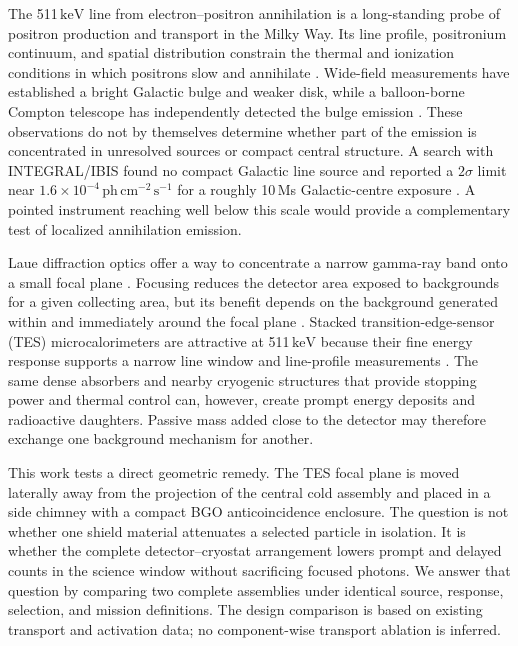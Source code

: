 \documentclass[11pt]{article}
\newcommand{\keV}{\ensuremath{\,\mathrm{keV}}\xspace}
\newcommand{\phflux}{\ensuremath{\,\mathrm{ph\,cm^{-2}\,s^{-1}}}\xspace}
\begin{document}
The 511\keV line from electron--positron annihilation is a long-standing probe
of positron production and transport in the Milky Way. Its line profile,
positronium continuum, and spatial distribution constrain the thermal and
ionization conditions in which positrons slow and annihilate
\citep{Jean2006,Prantzos2011,Siegert2016}. Wide-field measurements have
established a bright Galactic bulge and weaker disk, while a balloon-borne
Compton telescope has independently detected the bulge emission
\citep{Kierans2020}. These observations do not by themselves determine whether
part of the emission is concentrated in unresolved sources or compact central
structure. A search with INTEGRAL/IBIS found no compact Galactic line source and
reported a $2\sigma$ limit near $1.6\times10^{-4}\phflux$ for a roughly 10\,Ms
Galactic-centre exposure \citep{DeCesare2011}. A pointed instrument reaching
well below this scale would provide a complementary test of localized
annihilation emission.

Laue diffraction optics offer a way to concentrate a narrow gamma-ray band
onto a small focal plane \citep{Barriere2009}. Focusing reduces the
detector area exposed to backgrounds for a given collecting area, but its
benefit depends on the background generated within and immediately around the
focal plane \citep{Weidenspointner2006}. Stacked transition-edge-sensor (TES)
microcalorimeters are attractive at 511\keV because their fine energy response
supports a narrow line window and line-profile measurements
\citep{Gottardi2021,Shirazi2023,Hu2026}. The same dense absorbers and nearby
cryogenic structures that provide stopping power and thermal control can,
however, create prompt energy deposits and radioactive daughters. Passive mass
added close to the detector may therefore exchange one background mechanism
for another.

This work tests a direct geometric remedy. The TES focal plane is moved
laterally away from the projection of the central cold assembly and placed in a
side chimney with a compact BGO anticoincidence enclosure. The question is not
whether one shield material attenuates a selected particle in isolation. It is
whether the complete detector--cryostat arrangement lowers prompt and delayed
counts in the science window without sacrificing focused photons. We answer
that question by comparing two complete assemblies under identical source,
response, selection, and mission definitions. The design comparison is based on
existing transport and activation data; no component-wise transport ablation is
inferred.
\end{document}
